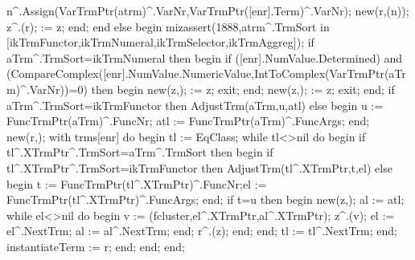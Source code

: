          n^.Assign(VarTrmPtr(atrm)^.VarNr,VarTrmPtr([enr].Term)^.VarNr);
         new(r,(n));
         z^.(r);
          := z;
      end;
   end
   else
   begin
      mizassert(1888,atrm^.TrmSort in [ikTrmFunctor,ikTrmNumeral,ikTrmSelector,ikTrmAggreg]);
      if aTrm^.TrmSort=ikTrmNumeral then
      begin
         if ([enr].NumValue.Determined) and
               (CompareComplex([enr].NumValue.NumericValue,IntToComplex(VarTrmPtr(aTrm)^.VarNr))=0) then
         begin
            new(z,);
             := z;
            exit;
         end;
         new(z,);
          := z;
         exit;
      end;
      if aTrm^.TrmSort=ikTrmFunctor then AdjustTrm(aTrm,u,atl)
      else
      begin
         u := FuncTrmPtr(aTrm)^.FuncNr;
         atl := FuncTrmPtr(aTrm)^.FuncArgs;
      end;
      new(r,);
      with trms[enr] do
      begin
         tl := EqClass;
         while tl<>nil do
         begin
            if tl^.XTrmPtr^.TrmSort=aTrm^.TrmSort then
            begin
               if tl^.XTrmPtr^.TrmSort=ikTrmFunctor then AdjustTrm(tl^.XTrmPtr,t,el)
               else
               begin t := FuncTrmPtr(tl^.XTrmPtr)^.FuncNr;el := FuncTrmPtr(tl^.XTrmPtr)^.FuncArgs;
               end;
               if t=u then
               begin
                  new(z,);
                  al := atl;
                  while el<>nil do
                  begin
                     v := (fcluster,el^.XTrmPtr,al^.XTrmPtr);
                     z^.(v);
                     el := el^.NextTrm;
                     al := al^.NextTrm;
                  end;
                  r^.(z);
               end;
            end;
            tl := tl^.NextTrm;
         end;
         instantiateTerm := r;
      end;
   end;
end;

